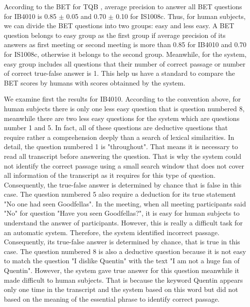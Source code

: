 \documentclass[10pt,a4paper]{article}
\numberwithin{algorithm}{section}  %
\begin{document}


According to the BET for TQB \cite{popescubelis2007otm}, average precision to answer all BET questions for IB4010 is 0.85 \ensuremath{\pm} 0.05 and 0.70 \ensuremath{\pm} 0.10 for IS1008c. Thus, for human subjects, we can divide the BET questions into two groups: easy and less easy. A BET question belongs to easy group as the first group if average precision of its answers as first meeting or second meeting is more than 0.85 for IB4010 and 0.70 for IS1008c, otherwise it belongs to the second group. Meanwhile, for the system, easy group includes all questions that  their number of correct passage or number of correct true-false answer is 1.
This help us have a standard to compare the BET scores by humans with scores obtainned by the system.

We examine first the results for IB4010. According to the convention above, for human subjects there is only one less easy question that is question numbered 8, meanwhile there are two less easy questions for the system which are questions number 1 and 5. In fact, all of these questions are deductive questions that require rather a comprehension deeply than a search of lexical similarities. In detail, the question numbered 1 is "throughout". That means it is necessary to read all transcript before answering the question. That is why the system could not identify the correct passage using a small search window that does not cover all information of the transcript as it requires for this type of question. Consequently, the true-false answer is determined by chance that is false in this case. The question numbered 5 also require a deduction for its true statement "No one had seen Goodfellas". In the meeting, when all meeting participants said "No" for question "Have you seen Goodfellas?", it is easy for human subjects to understand the answer of participants. However, this is really a difficult task for an automatic system.  Therefore, the system identified incorrect passage. Consequently, its true-false answer is determined by chance, that is true in this case. The question numbered 8 is also a deductive question because it is not easy to match the question "I dislike Quentin" with the text "I am not a huge fan of Quentin". However, the system gave true answer for this question meanwhile it made difficult to human subjects. That is because the keyword Quentin appears only one time in the transcript and the system based on this word but did not based on the meaning of the essential phrase to identify correct passage.
\end{document}
